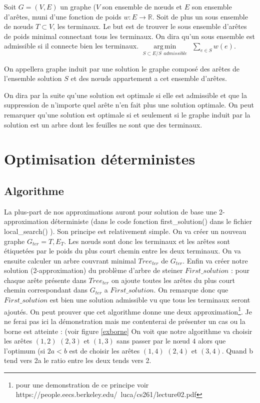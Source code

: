 \documentclass[10pt,a4paper]{article}
\DeclareMathOperator*{\argmin}{arg\,min}
\begin{document}
Soit $G = (V,E)$ un graphe ($V$ son ensemble de nœuds et $E$ son ensemble d'arêtes, muni d'une fonction de poids $w:E\rightarrow \mathbb{R}$. Soit de plus un sous ensemble de nœuds $T \subset V$, les terminaux. Le but est de trouver le sous ensemble d'arêtes de poids minimal connectant tous les terminaux. On dira qu'un sous ensemble est admissible si il connecte bien les terminaux.  $\argmin\limits_{S\subset E / S ~~admissible} ~~ \sum\limits_{e\in S} w(e) $. 

On appellera graphe induit par une solution le graphe composé des arêtes de l'ensemble solution $S$ et des nœuds appartement a cet ensemble d'arêtes. 

On dira par la suite qu'une solution est optimale si elle est admissible et que la suppression de n'importe quel arête n'en fait plus une solution optimale. On peut remarquer qu'une solution est optimale si et seulement si le graphe induit par la solution est un arbre dont les feuilles ne sont que des terminaux. 

\section{Optimisation déterministes}

\subsection{Algorithme}
La plus-part de nos approximations auront pour solution de base une 2-approximation déterministe (dans le code fonction first\_solution() dans le fichier local\_search() ).
Son principe est relativement simple. On va créer un nouveau graphe $G_{ter} = {T, E_T}$. Les nœuds sont donc les terminaux et les arêtes sont étiquetées par le poids du plus court chemin entre les deux terminaux. On va ensuite calculer un arbre couvrant minimal $Tree_{ter}$ de $G_{ter}$. Enfin va créer notre solution (2-approximation) du problème d'arbre de steiner $First\_solution$ :  pour chaque arête présente dans $Tree_{ter}$ on ajoute toutes les arêtes du plus court chemin correspondant dans $G_{ter} $ a $First\_solution$. On remarque donc que $First\_solution$ est bien une solution admissible vu que tous les terminaux seront ajoutés. On peut prouver que cet algorithme donne une deux approximation\footnote{pour une demonstration de ce principe voir https://people.eecs.berkeley.edu/~luca/cs261/lecture02.pdf}. Je ne ferai pas ici la démonstration mais me contenterai de présenter un cas ou la borne est atteinte : (voir figure \ref{exborne} On voit que notre algorithme va choisir les arêtes $(1,2)$ $(2,3)$ et $(1,3)$ sans passer par le nœud $4$ alors que l'optimum (si $2a<b$ est de choisir les arêtes $(1,4)$ $(2,4)$ et $(3,4)$. Quand b tend vers 2a le ratio entre les deux tends vers 2.
\end{document}
